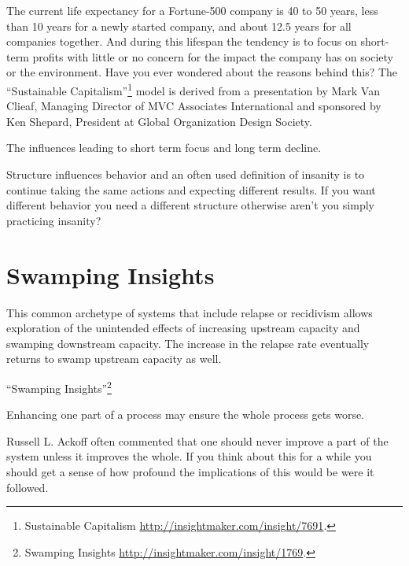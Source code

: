 \documentclass[]{memoir}
\begin{document}
The current life expectancy for a Fortune-500 company is 40 to 50 years,
less than 10 years for a newly started company, and about 12.5 years for
all companies together. And during this lifespan the tendency is to
focus on short-term profits with little or no concern for the impact the
company has on society or the environment. Have you ever wondered about
the reasons behind this? The ``Sustainable Capitalism''\footnote{Sustainable
  Capitalism \url{http://insightmaker.com/insight/7691}.} model is
derived from a presentation by Mark Van Clieaf, Managing Director of MVC
Associates International and sponsored by Ken Shepard, President at
Global Organization Design Society.

\FloatBarrier 

\begin{model}[frametitle={Model: Sustainable Capitalism}] 

 The influences leading to short term focus and long term decline.




 \end{model}

Structure influences behavior and an often used definition of insanity
is to continue taking the same actions and expecting different results.
If you want different behavior you need a different structure otherwise
aren't you simply practicing insanity?

\section{Swamping Insights}

This common archetype of systems that include relapse or recidivism
allows exploration of the unintended effects of increasing upstream
capacity and swamping downstream capacity. The increase in the relapse
rate eventually returns to swamp upstream capacity as well.

``Swamping Insights''\footnote{Swamping Insights
  \url{http://insightmaker.com/insight/1769}.}

\FloatBarrier 

\begin{model}[frametitle={Model: Swamping Insights}] 

 Enhancing one part of a process may ensure the whole process gets worse.




 \end{model}

Russell L. Ackoff often commented that one should never improve a part
of the system unless it improves the whole. If you think about this for
a while you should get a sense of how profound the implications of this
would be were it followed.
\end{document}
